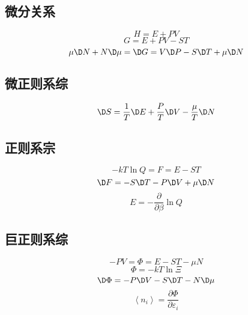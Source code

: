 \subsection{微分关系}
\begin{equation}
  H = E + PV
\end{equation}
\begin{equation}
  G = E + PV - ST
\end{equation}
\begin{equation}
  \mu  \D N + N \D \mu  =  \D G = V \D P - S \D T + \mu  \D N
\end{equation}
\subsection{微正则系综}
\begin{equation}
   \D S = \frac{1}{T} \D E + \frac{P}{T} \D V - \frac{\mu }{T} \D N
\end{equation}
\subsection{正则系宗}
\begin{equation}
   - kT\ln Q = F = E - ST
\end{equation}
\begin{equation}
   \D F =  - S \D T - P \D V + \mu  \D N
\end{equation}
\begin{equation}
  E =  - \frac{\partial }{{\partial \beta }}\ln Q
\end{equation}
\subsection{巨正则系综}
\begin{equation}
   - PV = \Phi  = E - ST - \mu N
\end{equation}
\begin{equation}
  \Phi  =  - kT\ln \Xi 
\end{equation}
\begin{equation}
   \D \Phi  =  - P \D V - S \D T - N \D \mu
\end{equation}
\begin{equation}
  \left\langle {{n_i}} \right\rangle  = \frac{{\partial \Phi }}{{\partial {\varepsilon _i}}}
\end{equation}
